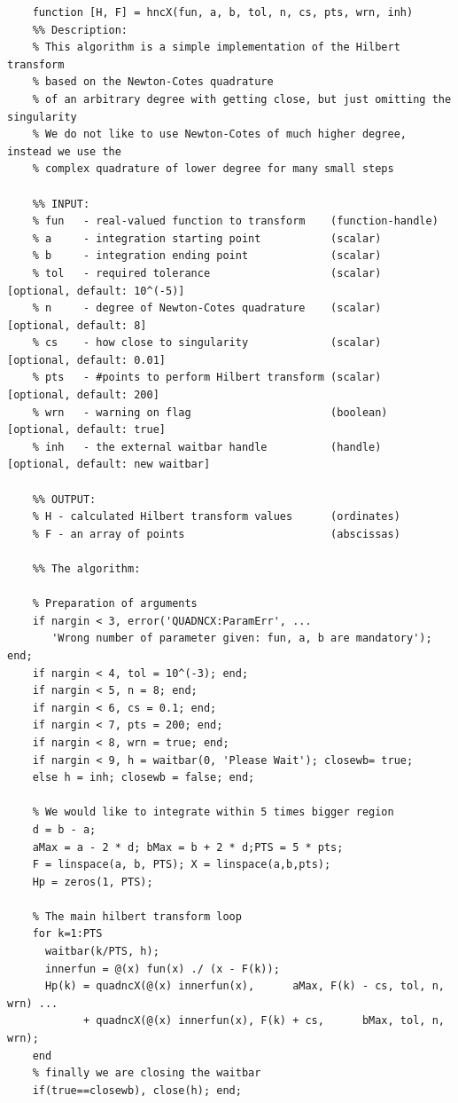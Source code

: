 \documentclass[12pt,twoside,a4paper]{article}
\numberwithin{equation}{subsection}
\numberwithin{figure}{subsection}
\begin{document}
\begin{lstlisting}
	function [H, F] = hncX(fun, a, b, tol, n, cs, pts, wrn, inh)
    %% Description:
    % This algorithm is a simple implementation of the Hilbert transform 
    % based on the Newton-Cotes quadrature
    % of an arbitrary degree with getting close, but just omitting the singularity
    % We do not like to use Newton-Cotes of much higher degree, instead we use the
    % complex quadrature of lower degree for many small steps  

    %% INPUT:
    % fun   - real-valued function to transform    (function-handle)
    % a     - integration starting point           (scalar)
    % b     - integration ending point             (scalar)
    % tol   - required tolerance                   (scalar)  [optional, default: 10^(-5)]
    % n     - degree of Newton-Cotes quadrature    (scalar)  [optional, default: 8]
    % cs    - how close to singularity             (scalar)  [optional, default: 0.01]
    % pts   - #points to perform Hilbert transform (scalar)  [optional, default: 200]
    % wrn   - warning on flag                      (boolean) [optional, default: true]
    % inh   - the external waitbar handle          (handle)  [optional, default: new waitbar]

    %% OUTPUT:
    % H - calculated Hilbert transform values      (ordinates)
    % F - an array of points                       (abscissas) 

    %% The algorithm:

    % Preparation of arguments
    if nargin < 3, error('QUADNCX:ParamErr', ...
       'Wrong number of parameter given: fun, a, b are mandatory'); end;
    if nargin < 4, tol = 10^(-3); end;
    if nargin < 5, n = 8; end;
    if nargin < 6, cs = 0.1; end;
    if nargin < 7, pts = 200; end;
    if nargin < 8, wrn = true; end;
    if nargin < 9, h = waitbar(0, 'Please Wait'); closewb= true; 
    else h = inh; closewb = false; end;

    % We would like to integrate within 5 times bigger region
    d = b - a;
    aMax = a - 2 * d; bMax = b + 2 * d;PTS = 5 * pts;
    F = linspace(a, b, PTS); X = linspace(a,b,pts);
    Hp = zeros(1, PTS);

    % The main hilbert transform loop
    for k=1:PTS
      waitbar(k/PTS, h);
      innerfun = @(x) fun(x) ./ (x - F(k));
      Hp(k) = quadncX(@(x) innerfun(x),      aMax, F(k) - cs, tol, n, wrn) ...
            + quadncX(@(x) innerfun(x), F(k) + cs,      bMax, tol, n, wrn);
    end
    % finally we are closing the waitbar
    if(true==closewb), close(h); end;


\end{lstlisting}
\end{document}
